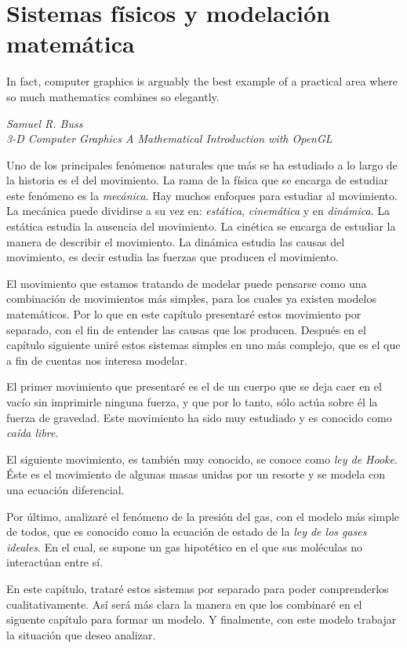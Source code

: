 \chapter{Sistemas físicos y modelación matemática}

\epigraph{In fact, computer graphics is arguably the best example of a practical area where so much mathematics combines so elegantly.}{\textit{Samuel R. Buss \\ 3-D Computer Graphics A Mathematical Introduction with OpenGL}}

Uno de los principales fenómenos naturales que más se ha estudiado a lo largo de la historia es el del movimiento.
La rama de la física que se encarga de estudiar este fenómeno es la \emph{mecánica}.
Hay muchos enfoques para estudiar al movimiento.
La mecánica puede dividirse a su vez en: \emph{estática}, \emph{cinemática} y en \emph{dinámica}.
La estática estudia la ausencia del movimiento.
La cinética se encarga de estudiar la manera de describir el movimiento.
La dinámica estudia las causas del movimiento, es decir estudia las fuerzas que producen el movimiento.

El movimiento que estamos tratando de modelar puede pensarse como una combinación de movimientos más simples, para los cuales ya existen modelos matemáticos.
Por lo que en este capítulo presentaré estos movimiento por separado, con el fin de entender las causas que los producen.
Después en el capítulo siguiente uniré estos sistemas simples en uno más complejo, que es el que a fin de cuentas nos interesa modelar.

El primer movimiento que presentaré es el de un cuerpo que se deja caer en el vacío sin imprimirle ninguna fuerza, y que por lo tanto, sólo actúa sobre él la fuerza de gravedad.
Este movimiento ha sido muy estudiado y es conocido como \emph{caída libre}. 

El siguiente movimiento, es también muy conocido, se conoce como \emph{ley de Hooke}.
Éste es el movimiento de algunas masas unidas por un resorte y se modela con una ecuación diferencial.

Por último, analizaré el fenómeno de la presión del gas, con el modelo más simple de todos, que es conocido como la ecuación de estado de la \emph{ley de los gases ideales}.
En el cual, se supone un gas hipotético en el que sus moléculas no interactúan entre sí.

En este capítulo, trataré estos sistemas por separado para poder comprenderlos cualitativamente.
Así será más clara la manera en que los combinaré en el siguente capítulo para formar un modelo.
Y finalmente, con este modelo trabajar la situación que deseo analizar.

